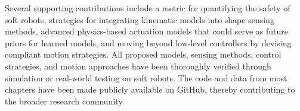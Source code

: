 Several supporting contributions include a metric for quantifying the safety of soft robots, strategies for integrating kinematic models into shape sensing methods, advanced physics-based actuation models that could serve as future priors for learned models, and moving beyond low-level controllers by devising compliant motion strategies. All proposed models, sensing methods, control strategies, and motion approaches have been thoroughly verified through simulation or real-world testing on soft robots. The code and data from most chapters have been made publicly available on GitHub, thereby contributing to the broader research community. 













